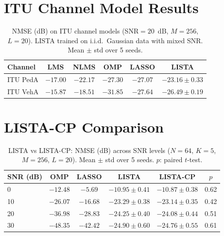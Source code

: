 \documentclass[a4paper,fleqn]{cas-sc}
\begin{document}
\section{ITU Channel Model Results}\label{sec:supp_itu}

\begin{table}[width=.9\linewidth,cols=6,pos=h]
\caption{NMSE (dB) on ITU channel models (SNR$=20$~dB, $M=256$, $L=20$). LISTA trained on i.i.d.~Gaussian data with mixed SNR. Mean $\pm$ std over 5 seeds.}\label{tab:itu}
\begin{tabular*}{\tblwidth}{@{} LCCCCC@{}}
\toprule
Channel & LMS & NLMS & OMP & LASSO & LISTA \\
\midrule
ITU PedA & $-17.00$ & $-22.17$ & $\bm{-27.30}$ & $-27.07$ & $-23.16 \pm 0.33$ \\
ITU VehA & $-15.87$ & $-18.51$ & $\bm{-31.85}$ & $-27.64$ & $-26.49 \pm 0.19$ \\
\bottomrule
\end{tabular*}
\end{table}


\section{LISTA-CP Comparison}\label{sec:supp_lista_cp}

\begin{table}[width=.9\linewidth,cols=5,pos=h]
\caption{LISTA vs LISTA-CP: NMSE (dB) across SNR levels ($N=64$, $K=5$, $M=256$, $L=20$). Mean $\pm$ std over 5 seeds. $p$: paired $t$-test.}\label{tab:lista_cp}
\begin{tabular*}{\tblwidth}{@{} LCCCCC@{}}
\toprule
SNR (dB) & OMP & LASSO & LISTA & LISTA-CP & $p$ \\
  & $-12.48$ & $-5.69$ & $-10.95 \pm 0.41$ & $-10.87 \pm 0.38$ & 0.62 \\
10 & $-26.07$ & $-16.68$ & $-23.29 \pm 0.38$ & $-23.14 \pm 0.35$ & 0.42 \\
20 & $-36.98$ & $-28.83$ & $-24.25 \pm 0.40$ & $-24.08 \pm 0.44$ & 0.51 \\
30 & $-48.35$ & $-42.42$ & $-24.90 \pm 0.60$ & $-24.76 \pm 0.55$ & 0.61 \\
\bottomrule
\end{tabular*}
\end{table}
\end{document}
